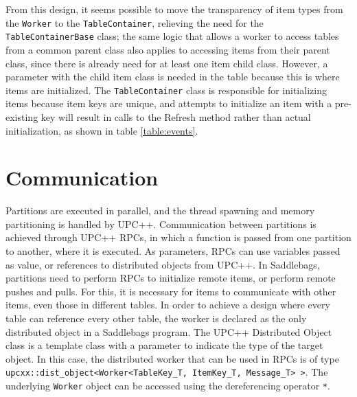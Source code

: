 \documentclass{uit-report}
\begin{document}
From this design, it seems possible to move the transparency of item types from the \texttt{Worker} to the \texttt{TableContainer}, relieving the need for the \texttt{TableContainerBase} class; the same logic that allows a worker to access tables from a common parent class also applies to accessing items from their parent class, since there is already need for at least one item child class. However, a parameter with the child item class is needed in the table because this is where items are initialized. The \texttt{TableContainer} class is responsible for initializing items because item keys are unique, and attempts to initialize an item with a pre-existing key will result in calls to the Refresh method rather than actual initialization, as shown in table \ref{table:events}.




\section{Communication}
Partitions are executed in parallel, and the thread spawning and memory partitioning is handled by UPC++. Communication between partitions is achieved through UPC++ RPCs, in which a function is passed from one partition to another, where it is executed. As parameters, RPCs can use variables passed as value, or references to distributed objects from UPC++. In Saddlebags, partitions need to perform RPCs to initialize remote items, or perform remote pushes and pulls. For this, it is necessary for items to communicate with other items, even those in different tables. In order to achieve a design where every table can reference every other table, the worker is declared as the only distributed object in a Saddlebags program. The UPC++ Distributed Object class is a template class with a parameter to indicate the type of the target object. In this case, the distributed worker that can be used in RPCs is of type \texttt{upcxx::dist\_object<Worker<TableKey\_T, ItemKey\_T, Message\_T> >}. The underlying \texttt{Worker} object can be accessed using the dereferencing operator \texttt{*}.
\end{document}
